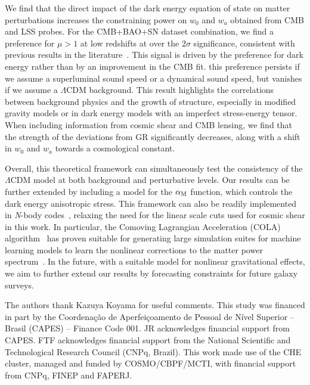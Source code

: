 \documentclass[%
reprint,
superscriptaddress,
preprint numbers,
nofootinbib,
amsmath,amssymb,
aps,
prd
]{revtex4-2}
\begin{document}
We find that the direct impact of the dark energy equation of state on matter perturbations increases the constraining power on $w_0$ and $w_a$ obtained from CMB and LSS probes. For the CMB+BAO+SN dataset combination, we find a preference for $\mu > 1$ at low redshifts at over the $2\sigma$ significance, consistent with previous results in the literature~\cite{Shah:2025vnt}. This signal is driven by the preference for  dark energy rather than by an improvement in the CMB fit.  this preference persists if we assume a superluminal sound speed or a dynamical sound speed, but vanishes if we assume a $\Lambda$CDM background. This result highlights the correlations between background physics and the growth of structure, especially in modified gravity models or in dark energy models with an imperfect stress-energy tensor. When including information from cosmic shear and CMB lensing, we find that the strength of the deviations from GR significantly decreases, along with a shift in $w_0$ and $w_a$ towards a cosmological constant. 

Overall, this theoretical framework can simultaneously test the consistency of the $\Lambda$CDM model at both background and perturbative levels. Our results can be further extended by including a model for the $\alpha_{\rm M}$ function, which controls the dark energy anisotropic stress. This framework can also be readily implemented in \textit{N}-body codes~\cite{mg_sims}, relaxing the need for the linear scale cuts used for cosmic shear in this work. In particular, the Comoving Lagrangian Acceleration (COLA) algorithm~\cite{Tassev:2013pn} has proven suitable for generating large simulation suites for machine learning models to learn the nonlinear corrections to the matter power spectrum~\cite{cola_wcdm, cola_w0wa}. In the future, with a suitable model for nonlinear gravitational effects, we aim to further extend our results by forecasting constraints for future galaxy surveys.

\acknowledgments

The authors thank Kazuya Koyama for useful comments. This study was financed in part by the Coordenação de Aperfeiçoamento de Pessoal de Nível Superior – Brasil (CAPES) – Finance Code 001. JR acknowledges financial support from CAPES. FTF acknowledges financial support from the National Scientific and Technological Research Council (CNPq, Brazil). This work made use of the CHE cluster, managed and funded by COSMO/CBPF/MCTI, with financial support from CNPq, FINEP and FAPERJ. 
\end{document}
